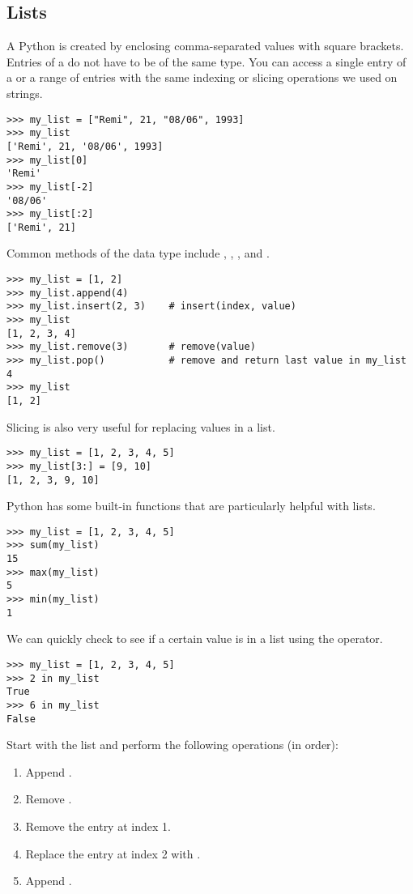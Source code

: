 
\subsection*{Lists}
A Python  is created by enclosing comma-separated values with square brackets. Entries of a  do not have to be of the same type. You can access a single entry of a  or a range of entries with the same indexing or slicing operations we used on strings. 
\begin{lstlisting}
>>> my_list = ["Remi", 21, "08/06", 1993]
>>> my_list
['Remi', 21, '08/06', 1993]
>>> my_list[0]
'Remi'
>>> my_list[-2]
'08/06'
>>> my_list[:2]
['Remi', 21]
\end{lstlisting}

Common methods of the  data type include , , , and .
\begin{lstlisting}
>>> my_list = [1, 2]
>>> my_list.append(4)
>>> my_list.insert(2, 3)	# insert(index, value)
>>> my_list
[1, 2, 3, 4]
>>> my_list.remove(3)       # remove(value)
>>> my_list.pop()           # remove and return last value in my_list
4
>>> my_list
[1, 2]
\end{lstlisting}

Slicing is also very useful for replacing values in a list.
\begin{lstlisting}
>>> my_list = [1, 2, 3, 4, 5]
>>> my_list[3:] = [9, 10]
[1, 2, 3, 9, 10]
\end{lstlisting}

Python has some built-in functions that are particularly helpful with lists.
\begin{lstlisting}
>>> my_list = [1, 2, 3, 4, 5]
>>> sum(my_list)
15
>>> max(my_list)
5
>>> min(my_list)
1
\end{lstlisting}

We can quickly check to see if a certain value is in a list using the  operator.
\begin{lstlisting}
>>> my_list = [1, 2, 3, 4, 5]
>>> 2 in my_list
True
>>> 6 in my_list
False
\end{lstlisting}

\begin{problem}
Start with the list  and perform the following operations (in order):
\begin{enumerate}
\item Append .
\item Remove .
\item Remove the entry at index 1.
\item Replace the entry at index 2 with .
\item Append .
\end{enumerate}
\end{problem}

